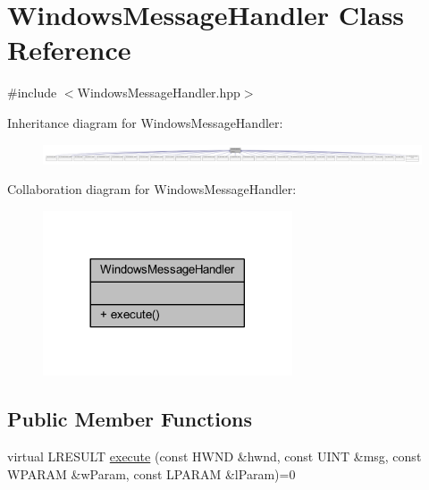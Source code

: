 \hypertarget{class_windows_message_handler}{}\section{Windows\+Message\+Handler Class Reference}
\label{class_windows_message_handler}


{\ttfamily \#include $<$Windows\+Message\+Handler.\+hpp$>$}



Inheritance diagram for Windows\+Message\+Handler\+:\nopagebreak
\begin{figure}[H]
\begin{center}
\leavevmode
\includegraphics[width=350pt]{class_windows_message_handler__inherit__graph}
\end{center}
\end{figure}


Collaboration diagram for Windows\+Message\+Handler\+:\nopagebreak
\begin{figure}[H]
\begin{center}
\leavevmode
\includegraphics[width=209pt]{class_windows_message_handler__coll__graph}
\end{center}
\end{figure}
\subsection*{Public Member Functions}
\begin{DoxyCompactItemize}
\item 
virtual L\+R\+E\+S\+U\+LT \hyperlink{class_windows_message_handler_a074016f348790bcb9cf1ffcad5777c37_a074016f348790bcb9cf1ffcad5777c37}{execute} (const H\+W\+ND \&hwnd, const U\+I\+NT \&msg, const W\+P\+A\+R\+AM \&w\+Param, const L\+P\+A\+R\+AM \&l\+Param)=0
\end{DoxyCompactItemize}


